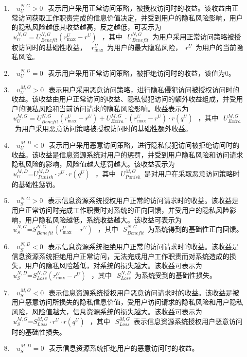 \begin{enumerate}
	\item  ~$~u_{U}^{N,G}>0~$~表示用户采用正常访问策略，被授权访问时的收益。该收益由正常访问获取工作职责完成的信息价值决定，并受到用户的隐私风险影响，用户的隐私风险越低其收益越高，反之越低，可表示为~$~u_{U}^{N,G}=U_{Benefit}^{N,G}(r_{\max }^{U}-{{r}^{U}})~$~，其中~$~U_{Benefit}^{N,G}$~为用户采用正常访问策略被授权访问时的基础性收益，~$~r_{\max }^{U}$~为用户的最大隐私风险，~${{r}^{U}}$~为用户的当前隐私风险。
	\item  ~$~u_{U}^{N,D}=0~$~表示用户采用正常访问策略，被拒绝访问时的收益，该值为0。
	\item  ~$~u_{U}^{M,G}>0~$~表示用户采用恶意访问策略，进行隐私侵犯访问被授权访问时的收益。该收益由用户正常访问的收益、隐私侵犯访问的额外收益组成，并受用户的隐私风险和当前访问请求的隐私风险影响。收益表示为~$~u_{U}^{M,G}=U_{Benefit}^{N,G}(r_{\max }^{U}-{{r}^{U}})+U_{Extra}^{M,G}\cdot (r_{\max }^{U}-{{r}^{U}})\cdot r({{q}^{U}})~$~，其中~$~U_{Extra}^{M,G}$~为用户采用恶意访问策略被授权访问时的基础性额外收益。
	\item  ~$~u_{U}^{M,D}<0~$~表示用户采用恶意访问策略，进行隐私侵犯访问被拒绝访问时的收益。该收益是信息资源系统对用户的惩罚，并受到用户隐私风险和访问请求隐私风险的影响，风险值越大惩罚越大。该收益表示为~$~u_{U}^{M,D}\text{=}U_{Punish}^{M,D}\cdot {{r}^{U}}\cdot r({{q}^{U}})~$~，其中~$~U_{Punish}^{M,G}$~是对用户在采取恶意访问策略时的基础性惩罚。
	\item  ~$~u_{S}^{N,G}>0~$~表示信息资源系统授权用户正常的访问请求时的收益。该收益是用户正常访问时完成工作职责时对系统的正向回馈，并受用户的隐私风险影响，用户隐私风险越低，系统收益越大。该收益可表示为~$~u_{S}^{N,G}\text{=}S_{Benefit}^{N,G}(r_{\max }^{U}-{{r}^{U}})~$~，其中~$~S_{Benefit}^{N,G}$~为系统得到的基础性正向回馈。
	\item ~$~u_{S}^{N,D}<0~$~表示信息资源系统拒绝用户正常的访问请求时的收益。该收益是信息资源系统拒绝用户正常访问，无法完成用户工作职责而对系统造成的损失，用户的隐私风险越低，对系统的损失越大。该收益可表示为~$~u_{S}^{N,D}\text{=}S_{Loss}^{N,D}(r_{\max }^{U}-{{r}^{U}})~$~，其中~$~S_{Loss}^{N,D}$~为系统受到的基础性损失。
	\item  ~$~u_{S}^{M,G}<0~$~表示信息资源系统授权用户恶意访问请求时的收益。该收益是被用户恶意访问所损失的隐私信息价值，受用户访问请求的隐私风险和用户隐私风险，风险值越大，信息资源系统的损失越大。该收益可表示为~$~u_{S}^{M,G}\text{=}S_{Loss}^{M,G}\cdot {{r}^{U}}\cdot r({{q}^{U}})~$~，其中~$~S_{Loss}^{M,G}$~表示信息资源系统授权用户恶意访问时的基础性损失。
	\item ~$~u_{S}^{M,D}=0~$~表示信息资源系统拒绝用户的恶意访问时的收益。
\end{enumerate}

